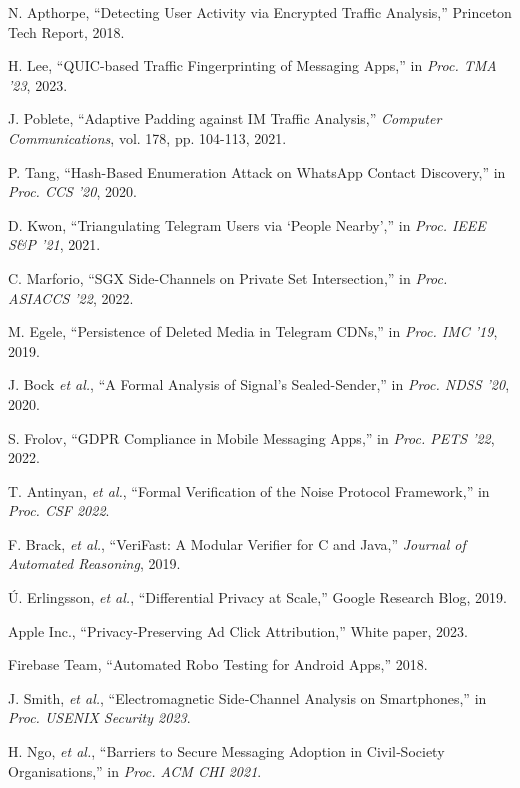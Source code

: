 \documentclass[a4paper,12pt]{report}
\begin{document}
\begin{thebibliography}{99}
N. Apthorpe, “Detecting User Activity via Encrypted Traffic Analysis,” Princeton Tech Report, 2018.

H. Lee, “QUIC-based Traffic Fingerprinting of Messaging Apps,” in \emph{Proc. TMA '23}, 2023.

J. Poblete, “Adaptive Padding against IM Traffic Analysis,” \emph{Computer Communications}, vol. 178, pp. 104-113, 2021.

P. Tang, “Hash-Based Enumeration Attack on WhatsApp Contact Discovery,” in \emph{Proc. CCS '20}, 2020.

D. Kwon, “Triangulating Telegram Users via ‘People Nearby’,” in \emph{Proc. IEEE S\&P '21}, 2021.

C. Marforio, “SGX Side-Channels on Private Set Intersection,” in \emph{Proc. ASIACCS '22}, 2022.

M. Egele, “Persistence of Deleted Media in Telegram CDNs,” in \emph{Proc. IMC '19}, 2019.

J. Bock \emph{et al.}, “A Formal Analysis of Signal’s Sealed-Sender,” in \emph{Proc. NDSS '20}, 2020.

S. Frolov, “GDPR Compliance in Mobile Messaging Apps,” in \emph{Proc. PETS '22}, 2022.

T. Antinyan, \emph{et al.}, “Formal Verification of the Noise Protocol Framework,” in \emph{Proc. CSF 2022}.

F. Brack, \emph{et al.}, “VeriFast: A Modular Verifier for C and Java,” \emph{Journal of Automated Reasoning}, 2019.

Ú. Erlingsson, \emph{et al.}, “Differential Privacy at Scale,” Google Research Blog, 2019.

Apple Inc., “Privacy‑Preserving Ad Click Attribution,” White paper, 2023.

Firebase Team, “Automated Robo Testing for Android Apps,” 2018.

J. Smith, \emph{et al.}, “Electromagnetic Side‑Channel Analysis on Smartphones,” in \emph{Proc. USENIX Security 2023}.

H. Ngo, \emph{et al.}, “Barriers to Secure Messaging Adoption in Civil‑Society Organisations,” in \emph{Proc. ACM CHI 2021}.


\end{thebibliography}
\end{document}
